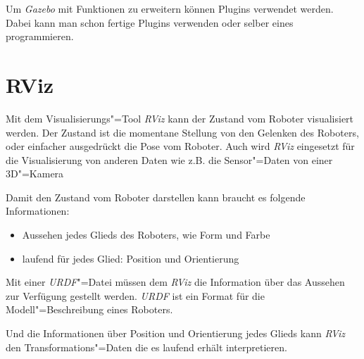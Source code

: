 Um \textit{Gazebo} mit Funktionen zu erweitern können Plugins verwendet werden.
Dabei kann man schon fertige Plugins verwenden oder selber eines programmieren. %

\section{RViz}
Mit dem Visualisierungs"=Tool \textit{RViz} kann der Zustand vom Roboter visualisiert werden.
Der Zustand ist die momentane Stellung von den Gelenken des Roboters, oder einfacher ausgedrückt die Pose vom Roboter.
Auch wird \textit{RViz} eingesetzt für die Visualisierung von anderen Daten wie z.B. die Sensor"=Daten von einer 3D"=Kamera

Damit  den Zustand vom Roboter darstellen kann braucht es folgende Informationen:
\begin{itemize}
\item Aussehen jedes Glieds des Roboters, wie Form und Farbe 
\item laufend für jedes Glied: Position und Orientierung
\end{itemize}

Mit einer \textit{URDF}"=Datei müssen dem \textit{RViz} die Information über das Aussehen zur Verfügung gestellt werden. %
\textit{URDF} ist ein Format für die Modell"=Beschreibung eines Roboters.

Und die Informationen über Position und Orientierung jedes Glieds kann \textit{RViz} den Transformations"=Daten die es laufend erhält interpretieren. %

